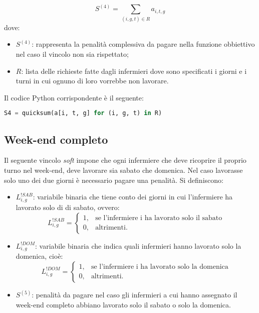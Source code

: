 \begin{equation}
S^{(4)} = \sum_{(i, g, t) \in R} a_{i, t, g}
\end{equation}
dove:
\begin{itemize}
\item $S^{(4)}$: rappresenta la penalità complessiva da pagare nella funzione obbiettivo nel caso il vincolo non sia rispettato;
\item $R$: lista delle richieste fatte dagli infermieri dove sono specificati i giorni e i turni in cui ognuno di loro vorrebbe non lavorare.
\end{itemize}

Il codice Python corrispondente è il seguente:
\begin{lstlisting}[language=Python]
S4 = quicksum(a[i, t, g] for (i, g, t) in R)
\end{lstlisting}

\subsection{Week-end completo}
Il seguente vincolo \textit{soft} impone che ogni infermiere che deve ricoprire il proprio turno nel week-end, deve lavorare sia sabato che domenica. Nel caso lavorasse solo uno dei due giorni è necessario pagare una penalità. Si definiscono:
\begin{itemize}
\item $L_{i, g}^{!SAB}$: variabile binaria che tiene conto dei giorni in cui l'infermiere ha lavorato solo di di sabato, ovvero:
\begin{equation}
\label{eq:varLavoratoSoloSabato}
L_{i, g}^{!SAB}=
\begin{cases}
1, & \text{se l'infermiere i ha lavorato solo il sabato} \\
0, & \text{altrimenti.}
\end{cases}
\end{equation}
\item $L_{i, g}^{!DOM}$: variabile binaria che indica quali infermieri hanno lavorato solo la domenica, cioè:
\begin{equation}
\label{eq:varLavoratoSoloDomenica}
L_{i, g}^{!DOM}=
\begin{cases}
1, & \text{se l'infermiere i ha lavorato solo la domenica} \\
0, & \text{altrimenti.}
\end{cases}
\end{equation}
\item $S^{(5)}$: penalità da pagare nel caso gli infermieri a cui hanno assegnato il week-end completo abbiano lavorato solo il sabato o solo la domenica. 
\end{itemize}

